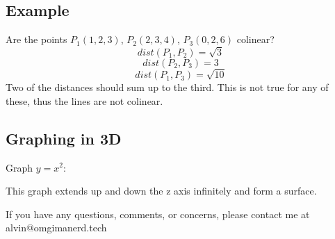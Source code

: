 \documentclass[letterpaper, 12pt]{math}
\begin{document}
\subsection*{Example}
Are the points \( P_{1}(1,2,3) \), \( P_{2}(2,3,4) \), \( P_{3}(0,2,6) \)
colinear?
\[ dist(P_{1},P_{2}) = \sqrt{3} \]
\[ dist(P_{2},P_{3}) = 3 \]
\[ dist(P_{1},P_{3}) = \sqrt{10} \]
Two of the distances should sum up to the third. This is not true for any of
these, thus the lines are not colinear.

\subsection*{Graphing in 3D}
Graph \( y = x^{2} \):
\begin{center}
\end{center}
This graph extends up and down the z axis infinitely and form a surface.

\begin{center}
  If you have any questions, comments, or concerns, please contact me at
  alvin@omgimanerd.tech
\end{center}
\end{document}
